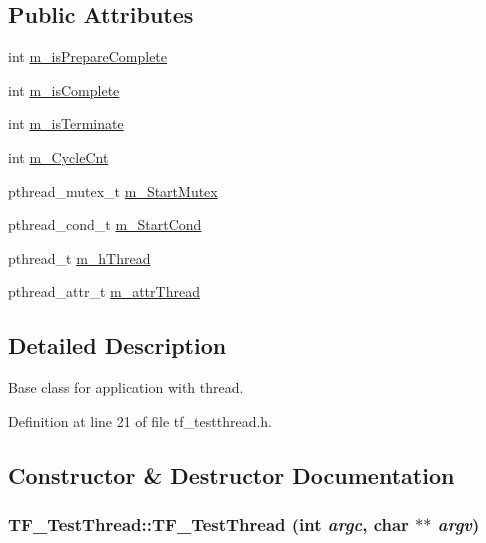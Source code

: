 \subsection*{Public Attributes}
\begin{DoxyCompactItemize}
\item 
int \hyperlink{classTF__TestThread_a5d92ac2f7010e79fb40326aa8980ddf3}{m\_\-isPrepareComplete}
\item 
int \hyperlink{classTF__TestThread_ab3f42e170b84b6b124fae56d403504c1}{m\_\-isComplete}
\item 
int \hyperlink{classTF__TestThread_ab7e24e3d4b9d6beb4a49d8845f5b2d9f}{m\_\-isTerminate}
\item 
int \hyperlink{classTF__TestThread_a796b7c7257792b3eabdb65b3e3d8d990}{m\_\-CycleCnt}
\item 
pthread\_\-mutex\_\-t \hyperlink{classTF__TestThread_a1ad6411cf734262c0d8e58a763c88cfb}{m\_\-StartMutex}
\item 
pthread\_\-cond\_\-t \hyperlink{classTF__TestThread_a45462e11e298f01d4868e084aa67be1c}{m\_\-StartCond}
\item 
pthread\_\-t \hyperlink{classTF__TestThread_a0c8b8d93ed2ae109221ea8da813ec389}{m\_\-hThread}
\item 
pthread\_\-attr\_\-t \hyperlink{classTF__TestThread_a111456494b43af46290cccae56efd170}{m\_\-attrThread}
\end{DoxyCompactItemize}


\subsection{Detailed Description}
Base class for application with thread. 

Definition at line 21 of file tf\_\-testthread.h.

\subsection{Constructor \& Destructor Documentation}
\hypertarget{classTF__TestThread_adc0b50667619b13b3791f96f8d9f3f9e}{
\subsubsection[{TF\_\-TestThread}]{\setlength{\rightskip}{0pt plus 5cm}TF\_\-TestThread::TF\_\-TestThread (int {\em argc}, \/  char $\ast$$\ast$ {\em argv})}}
\label{classTF__TestThread_adc0b50667619b13b3791f96f8d9f3f9e}



